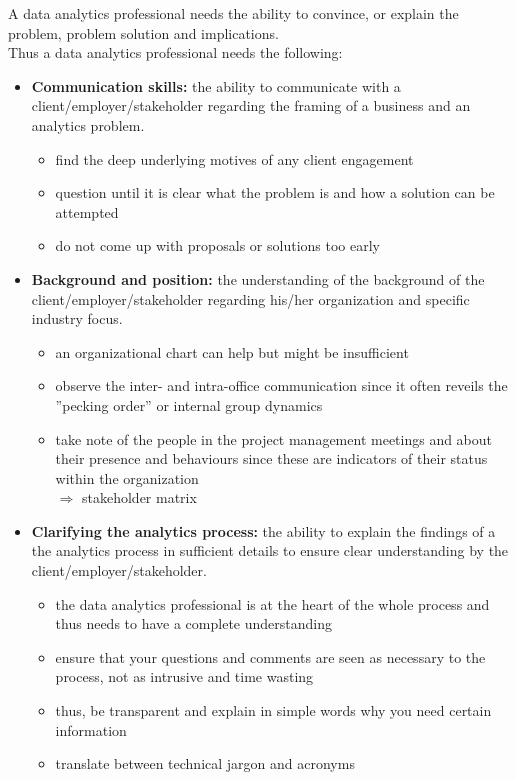 \documentclass[a4paper, landscape, 6pt, fleqn]{scrartcl}
\renewcommand{\emph}[1]{\textbf{#1}}
\begin{document}
\begin{multicols*}{4}
A data analytics professional needs the ability to convince, or explain the problem, problem solution and implications. \\
Thus a data analytics professional needs the following:
\begin{itemize}
\item \emph{Communication skills:} the ability to communicate with a client/employer/stakeholder regarding the framing of a business and an analytics problem.
\begin{itemize}
\item find the deep underlying motives of any client engagement
\item question until it is clear what the problem is and how a solution can be attempted
\item do not come up with proposals or solutions too early
\end{itemize}
\item \emph{Background and position:} the understanding of the background of the client/employer/stakeholder regarding his/her organization and specific industry focus.
\begin{itemize}
\item an organizational chart can help but might be insufficient
\item observe the inter- and intra-office communication since it often reveils the ''pecking order'' or internal group dynamics
\item take note of the people in the project management meetings and about their presence and behaviours since these are indicators of their status within the organization \\
$\Rightarrow$ stakeholder matrix
\end{itemize}
\item \emph{Clarifying the analytics process:} the ability to explain the findings of a the analytics process in sufficient details to ensure clear understanding by the client/employer/stakeholder.
\begin{itemize}
\item the data analytics professional is at the heart of the whole process and thus needs to have a complete understanding
\item ensure that your questions and comments are seen as necessary to the process, not as intrusive and time wasting
\item thus, be transparent and explain in simple words why you need certain information
\item translate between technical jargon and acronyms
\end{itemize}
\end{itemize}


\end{multicols*}
\end{document}
